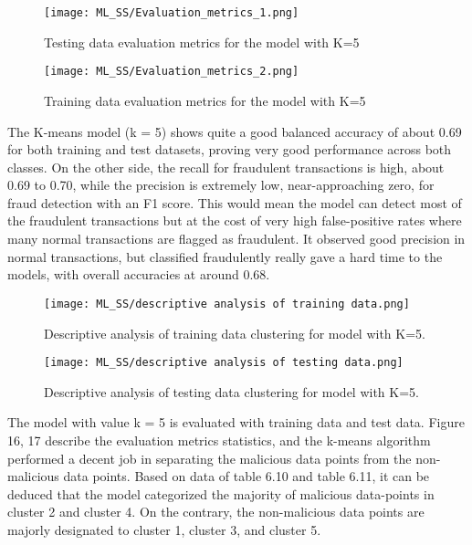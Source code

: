 \documentclass[journal]{IEEEtran}
\begin{document}
\begin{figure}[h!] %
    \centering
    \texttt{[image: ML\_SS/Evaluation\_metrics\_1.png]}%
    \caption{Testing data evaluation metrics for the model with K=5}
    \label{fig:autoencoder-structure}
\end{figure}
\begin{figure}[h!] %
    \centering
    \texttt{[image: ML\_SS/Evaluation\_metrics\_2.png]}%
    \caption{Training data evaluation metrics for the model with K=5}
    \label{fig:autoencoder-structure}
\end{figure}
The K-means model (k = 5) shows quite a good balanced accuracy of about 0.69 for both training and test datasets, proving very good performance across both classes. On the other side, the recall for fraudulent transactions is high, about 0.69 to 0.70, while the precision is extremely low, near-approaching zero, for fraud detection with an F1 score. This would mean the model can detect most of the fraudulent transactions but at the cost of very high false-positive rates where many normal transactions are flagged as fraudulent. It observed good precision in normal transactions, but classified fraudulently really gave a hard time to the models, with overall accuracies at around 0.68.
\begin{figure}[h!] %
    \centering
    \texttt{[image: ML\_SS/descriptive analysis of training data.png]}%
    \caption{Descriptive analysis of training data clustering for model with K=5.}
    \label{fig:autoencoder-structure}
\end{figure}

\begin{figure}[h!] %
    \centering
    \texttt{[image: ML\_SS/descriptive analysis of testing data.png]}%
    \caption{Descriptive analysis of testing data clustering for model with K=5.}
    \label{fig:autoencoder-structure}
\end{figure}
The model with value k = 5 is evaluated with training data and test data. Figure 16, 17 describe the evaluation metrics statistics, and the k-means algorithm performed a decent job in separating the malicious data points from the non-malicious data points. Based on data of table 6.10 and table 6.11, it can be deduced that the model categorized the majority of malicious data-points in cluster 2 and cluster 4. On the contrary, the non-malicious data points are majorly designated to cluster 1, cluster 3, and cluster 5. 
\end{document}
